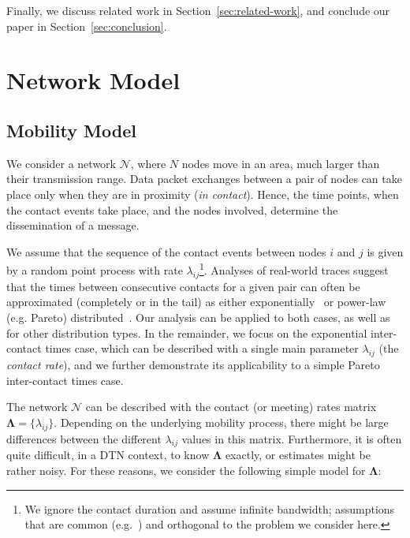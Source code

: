 \documentclass[journal]{IEEEtran}
\newcommand{\revisionRed}[1]{{#1}}\newcommand{\red}[1]{{#1}}
\begin{document}
\revisionRed{
Finally, we discuss related work in Section~\ref{sec:related-work}, and conclude our paper in Section~\ref{sec:conclusion}.
}





\section{Network Model}\label{sec:network-model}
\subsection{Mobility Model}\label{sec:mobility-model}
We consider a network $\mathcal{N}$, where $N$ nodes move in an area, much larger than their transmission range. Data packet exchanges between a pair of nodes can take place only when they are in proximity (\textit{in contact}). Hence, the time points, when the contact events take place, and the nodes involved, determine the dissemination of a message.

We assume that the sequence of the contact events between nodes $i$ and $j$ is given by a random point process with rate $\lambda_{ij}$\footnote{We ignore the contact duration and assume infinite bandwidth; assumptions that are common (e.g.~\cite{Gao-user-centric-DTN,multiple-offloading}) and orthogonal to the problem we consider here.}. Analyses of real-world traces suggest that the times between consecutive contacts for a given pair can often be approximated (completely or in the tail) as either exponentially~\cite{Gao2009,Conan2007} or power-law (e.g. Pareto) distributed~\cite{chaintreau-tmc}. \red{Our analysis can be applied to both cases, as well as for other distribution types. In the remainder, we focus on the exponential inter-contact times case, which can be described with a single main parameter $\lambda_{ij}$ (the \textit{contact rate}), and we further demonstrate its applicability to a simple Pareto inter-contact times case.}

The network $\mathcal{N}$ can be described with the contact (or meeting) rates matrix $\mathbf{\Lambda} = \lbrace\lambda_{ij}\rbrace$. Depending on the underlying mobility process, there might be large differences between the different $\lambda_{ij}$ values in this matrix. Furthermore, it is often quite difficult, in a DTN context, to know $\mathbf{\Lambda}$ exactly, or estimates might be rather noisy. For these reasons, we consider the following simple model for $\mathbf{\Lambda}$:
\end{document}

